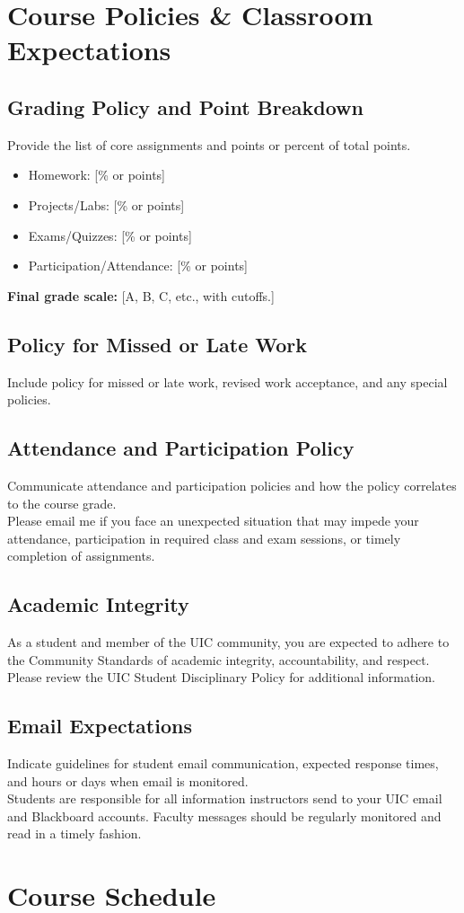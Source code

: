 \documentclass[11pt]{article}
\newcommand{\gradingPolicy}{%
Provide the list of core assignments and points or percent of total points.
\begin{itemize}
  \item Homework: [\% or points]
  \item Projects/Labs: [\% or points]
  \item Exams/Quizzes: [\% or points]
  \item Participation/Attendance: [\% or points]
\end{itemize}
\textbf{Final grade scale:} [A, B, C, etc., with cutoffs.]
}
\newcommand{\lateWorkPolicy}{%
Include policy for missed or late work, revised work acceptance, and any special policies.
}
\newcommand{\attendanceParticipationPolicy}{%
Communicate attendance and participation policies and how the policy correlates to the course grade. \\
Please email me if you face an unexpected situation that may impede your attendance,
participation in required class and exam sessions, or timely completion of assignments.
}
\newcommand{\academicIntegrityPolicy}{%
As a student and member of the UIC community, you are expected to adhere to the Community Standards
of academic integrity, accountability, and respect. Please review the UIC Student Disciplinary Policy
for additional information.
}
\newcommand{\emailExpectations}{%
Indicate guidelines for student email communication, expected response times, and hours or days when email is monitored. \\
Students are responsible for all information instructors send to your UIC email and Blackboard accounts.
Faculty messages should be regularly monitored and read in a timely fashion.
}
\begin{document}
\section*{Course Policies \& Classroom Expectations}

\subsection*{Grading Policy and Point Breakdown}
\gradingPolicy

\subsection*{Policy for Missed or Late Work}
\lateWorkPolicy

\subsection*{Attendance and Participation Policy}
\attendanceParticipationPolicy

\subsection*{Academic Integrity}
\academicIntegrityPolicy

\subsection*{Email Expectations}
\emailExpectations

\section*{Course Schedule}
\end{document}
